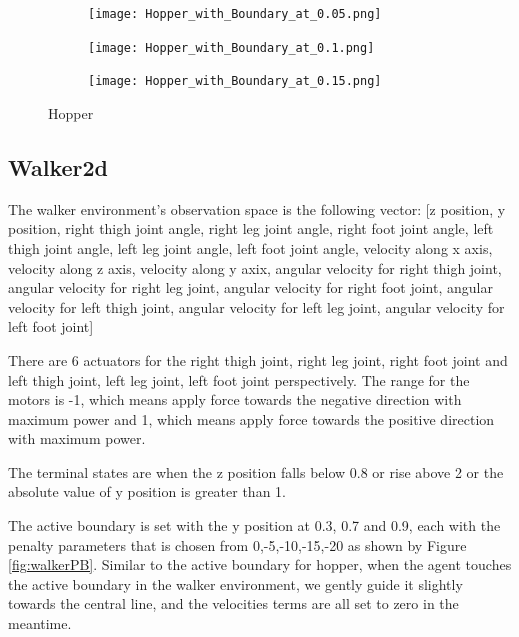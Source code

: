 \documentclass[journal]{IEEEtran}
\begin{document}
\begin{figure}
    \centering
    \begin{subfigure}[b]{0.5\textwidth}
      \centering
      \texttt{[image: Hopper\_with\_Boundary\_at\_0.05.png]}
    \end{subfigure}
    \vspace*{0.0mm}
    \begin{subfigure}[b]{0.5\textwidth}
      \centering
      \texttt{[image: Hopper\_with\_Boundary\_at\_0.1.png]}
    \end{subfigure}
    \vspace*{0.0mm}
    \begin{subfigure}[b]{0.5\textwidth}
      \centering
      \texttt{[image: Hopper\_with\_Boundary\_at\_0.15.png]}
    \end{subfigure}
    \caption{Hopper}
    \label{fig:Hopper}
\end{figure}


\subsection{Walker2d}
The walker environment's observation space is the following vector: [z position, y position, right thigh joint angle, right leg joint angle, right foot joint angle, left thigh joint angle, left leg joint angle, left foot joint angle, velocity along x axis, velocity along z axis, velocity along y axix, angular velocity for right thigh joint, angular velocity for right leg joint, angular velocity for right foot joint, angular velocity for left thigh joint, angular velocity for left leg joint, angular velocity for left foot joint]

There are 6 actuators for the right thigh joint, right leg joint, right foot joint and left thigh joint, left leg joint, left foot joint perspectively. The range for the motors is -1, which means apply force towards the negative direction with maximum power and 1, which means apply force towards the positive direction with maximum power.

The terminal states are when the z position falls below 0.8 or rise above 2 or the absolute value of y position is greater than 1.

The active boundary is set with the y position at 0.3, 0.7 and 0.9, each with the penalty parameters that is chosen from 0,-5,-10,-15,-20 as shown by Figure \ref{fig:walkerPB}. Similar to the active boundary for hopper, when the agent touches the active boundary in the walker environment, we gently guide it slightly towards the central line, and the velocities terms are all set to zero in the meantime.
\end{document}
